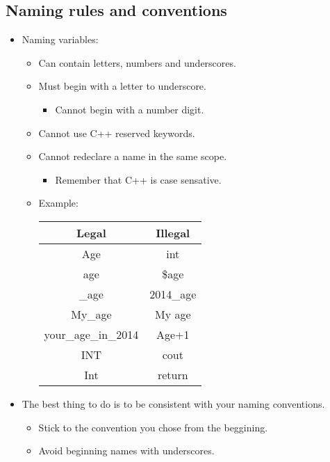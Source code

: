 \subsection{Naming rules and conventions}
\begin{itemize}
    \item Naming variables: 
        \begin{itemize}
            \item Can contain letters, numbers and underscores.
            \item Must begin with a letter to underscore.
                \begin{itemize}
                    \item Cannot begin with a number digit.
                \end{itemize}
            \item Cannot use C++ reserved keywords.
            \item Cannot redeclare a name in the same scope.
                \begin{itemize}
                    \item Remember that C++ is case sensative.
                \end{itemize}
            
            \item Example: 
                \begin{center}
                    \begin{tabular}{ |c|c| }
                        \hline
                            Legal & Illegal \\
                        \hline
                            Age & int \\ 
                            age & \$age \\ 
                            \_age & 2014\_age \\ 
                            My\_age & My age \\ 
                            your\_age\_in\_2014 & Age+1 \\ 
                            INT & cout \\ 
                            Int & return \\ 
                        \hline
                    \end{tabular}
                \end{center}
        \end{itemize}
    \item The best thing to do is to be consistent with your naming conventions.
        \begin{itemize}
            \item Stick to the convention you chose from the beggining.
            \item Avoid beginning names with underscores.
        \end{itemize}
    

\end{itemize}
